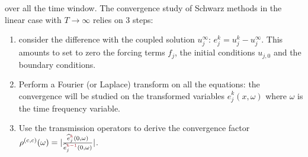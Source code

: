 over all the time window. The convergence study of Schwarz methods
in the linear case with $T\rightarrow \infty$ relies on 3 steps:
\begin{enumerate}
	\item consider the difference with the coupled solution
		$u^\infty_j$:
		$e^k_j = u^k_j - u^\infty_j$. This amounts to
		set to zero the forcing terms $f_j$,
		the initial conditions $u_{j,0}$ and
		the boundary conditions.
	\item Perform a Fourier (or Laplace) transform on all the
		equations: the convergence will be studied on
		the transformed variables
		$\widehat{e}^k_j(x,\omega)$ where $\omega$ is
		the time frequency variable.
	\item Use the transmission operators to derive the
		convergence factor $\rho^{(c, c)}(\omega) =
		|\frac{\widehat{e}^{\emphase{k}}_j(0,\omega)}
		{\widehat{e}^{\emphase{k-1}}_j(0,\omega)}|$.
\end{enumerate}
